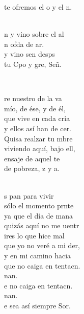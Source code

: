 \documentclass[12pt]{article}
\begin{document}
\begin{multicols*}{2}
\begin{cancion}
	te ofremos el o y el n. \\\jump\\
	\begin{chorus}%
	n y vino sobre el al\\
	n ofda de ar.\\
	 y vino sen desps \\
	tu Cpo y gre, Señ. \\
	\end{chorus}%
	\jump\\
\end{cancion}%

\begin{cancion}%
	re nuestro de la va\\
	mío, de ése, y de él,\\
	que vive en cada cria\\
	y ellos así han de cer.\\
	Quisa realzar tu mbre\\
	viviendo aquí, bajo ell,\\
	ensaje de aquel te\\
	de pobreza, z y a.\\\jump\\
	\begin{chorus}%
	s pan para vivir\\
	sólo el momento prnte\\
	ya que el día de mana \\
	quizás aquí no me uentr\\
	ires lo que hice mal\\
	que yo no veré a mi der,\\
	y en mi camino hacia \\
	que no caiga en tentacn.\\
	nan.\\
	e no caiga en tentacn.\\
	nan.\\
	e sea así siempre Sor.\\
	\end{chorus}%
	\jump\\
\end{cancion}%


\end{multicols*}
\end{document}
